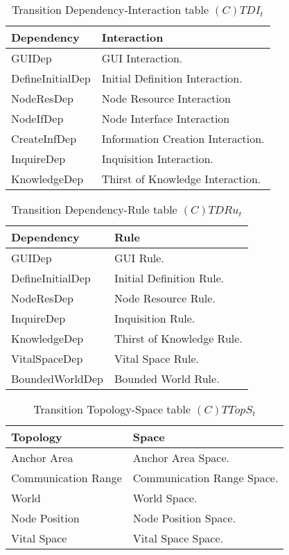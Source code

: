 \begin{table}[H]
	\centering
	\begin{tabular}{|p{4cm}|p{8cm}|}
			\hline
			\textbf{Dependency} & \textbf{Interaction} \\
			\hline
			GUIDep & GUI Interaction. \\
			\hline
			DefineInitialDep & Initial Definition Interaction. \\
			\hline
			NodeResDep & Node Resource Interaction \\
			\hline
			NodeIfDep & Node Interface Interaction \\
			\hline
			CreateInfDep & Information Creation Interaction. \\
			\hline
			InquireDep & Inquisition Interaction. \\
			\hline
			KnowledgeDep & Thirst of Knowledge Interaction. \\
			\hline
		\end{tabular}
	\caption{Transition Dependency-Interaction table $(C)TDI_t$}
	\label{tab:ctdit}
\end{table}

\begin{table}[H]
	\centering
	\begin{tabular}{|p{4cm}|p{8cm}|}
			\hline
			\textbf{Dependency} & \textbf{Rule} \\
			\hline
			GUIDep & GUI Rule. \\
			\hline
			DefineInitialDep & Initial Definition Rule. \\
			\hline
			NodeResDep & Node Resource Rule. \\
			\hline
			InquireDep & Inquisition Rule. \\
			\hline
			KnowledgeDep & Thirst of Knowledge Rule. \\
			\hline
			VitalSpaceDep & Vital Space Rule. \\
			\hline
			BoundedWorldDep & Bounded World Rule. \\
			\hline
		\end{tabular}
	\caption{Transition Dependency-Rule table $(C)TDRu_t$}
	\label{tab:ctdrut}
\end{table}

\begin{table}[H]
	\centering
	\begin{tabular}{|p{4cm}|p{8cm}|}
			\hline
			\textbf{Topology} & \textbf{Space} \\
			\hline
			Anchor Area & Anchor Area Space.\\
			\hline
			Communication Range & Communication Range Space. \\
			\hline
			World & World Space. \\
			\hline
			Node Position & Node Position Space. \\
			\hline
			Vital Space & Vital Space Space. \\
			\hline
		\end{tabular}
	\caption{Transition Topology-Space table $(C)TTopS_t$}
	\label{tab:cttopst}
\end{table}

